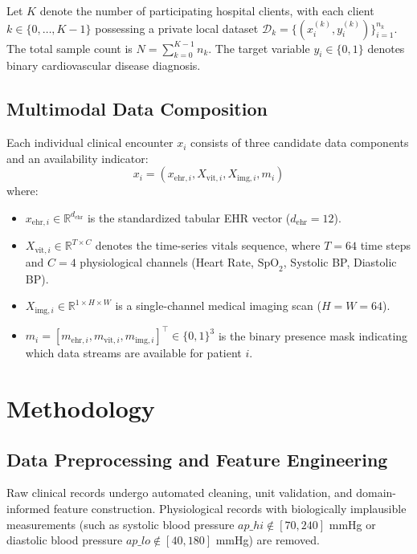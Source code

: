 \documentclass[10pt,conference]{IEEEtran}
\begin{document}
Let $K$ denote the number of participating hospital clients, with each client $k \in \{0, \dots, K-1\}$ possessing a private local dataset $\mathcal{D}_k = \{(x_i^{(k)}, y_i^{(k)})\}_{i=1}^{n_k}$. The total sample count is $N = \sum_{k=0}^{K-1} n_k$. The target variable $y_i \in \{0, 1\}$ denotes binary cardiovascular disease diagnosis. 

\subsection{Multimodal Data Composition}
Each individual clinical encounter $x_i$ consists of three candidate data components and an availability indicator:
\begin{equation}
    x_i = \left( x_{\mathrm{ehr}, i}, X_{\mathrm{vit}, i}, X_{\mathrm{img}, i}, m_i \right)
\end{equation}
where:
\begin{itemize}
    \item $x_{\mathrm{ehr}, i} \in \mathbb{R}^{d_{\mathrm{ehr}}}$ is the standardized tabular EHR vector ($d_{\mathrm{ehr}} = 12$).
    \item $X_{\mathrm{vit}, i} \in \mathbb{R}^{T \times C}$ denotes the time-series vitals sequence, where $T=64$ time steps and $C=4$ physiological channels (Heart Rate, $\text{SpO}_2$, Systolic BP, Diastolic BP).
    \item $X_{\mathrm{img}, i} \in \mathbb{R}^{1 \times H \times W}$ is a single-channel medical imaging scan ($H=W=64$).
    \item $m_i = [m_{\mathrm{ehr}, i}, m_{\mathrm{vit}, i}, m_{\mathrm{img}, i}]^\top \in \{0, 1\}^3$ is the binary presence mask indicating which data streams are available for patient $i$.
\end{itemize}

\section{Methodology}

\subsection{Data Preprocessing and Feature Engineering}
Raw clinical records undergo automated cleaning, unit validation, and domain-informed feature construction. Physiological records with biologically implausible measurements (such as systolic blood pressure $ap\_hi \notin [70, 240]$ mmHg or diastolic blood pressure $ap\_lo \notin [40, 180]$ mmHg) are removed.
\end{document}
